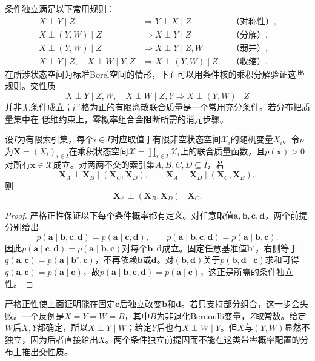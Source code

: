 条件独立满足以下常用规则：
\[
\begin{aligned}
  X\perp Y\mid Z
  &\Longrightarrow Y\perp X\mid Z
  &&\text{（对称性）},\\
  X\perp(Y,W)\mid Z
  &\Longrightarrow X\perp Y\mid Z
  &&\text{（分解）},\\
  X\perp(Y,W)\mid Z
  &\Longrightarrow X\perp Y\mid Z,W
  &&\text{（弱并）},\\
  X\perp Y\mid Z,\quad X\perp W\mid Y,Z
  &\Longrightarrow X\perp(Y,W)\mid Z
  &&\text{（收缩）}.
\end{aligned}
\]
在所涉状态空间为标准Borel空间的情形，下面可以用条件核的乘积分解验证这些规则。交性质
\[ X\perp Y\mid Z,W,\quad
  X\perp W\mid Z,Y\Longrightarrow X\perp(Y,W)\mid Z \]
并非无条件成立；严格为正的有限离散联合质量是一个常用充分条件。若分布把质量集中在
低维约束上，零概率组合会阻断所需的消元步骤。

\begin{lemma}[严格正离散分布的交性质]
  \label{lem:probability-positive-intersection}
  设$I$为有限索引集，每个$i\in I$对应取值于有限非空状态空间$\mathcal{X}_i$的随机变量$X_i$。令$p$为$\bm{X}=(X_i)_{i\in I}$在乘积状态空间$\mathcal{X}=\prod_{i\in I}\mathcal{X}_i$上的联合质量函数，且$p(\bm{x})>0$对所有$\bm{x}\in\mathcal{X}$成立。对两两不交的索引集$A,B,C,D\subseteq I$，若
  \[
    \bm{X}_A\perp\bm{X}_B\mid(\bm{X}_C,\bm{X}_D),
    \qquad
    \bm{X}_A\perp\bm{X}_D\mid(\bm{X}_C,\bm{X}_B),
  \]
  则
  \[
    \bm{X}_A\perp(\bm{X}_B,\bm{X}_D)\mid\bm{X}_C.
  \]
\end{lemma}

\begin{proof}
严格正性保证以下每个条件概率都有定义。对任意取值$\bm{a},\bm{b},\bm{c},\bm{d}$，两个前提分别给出
\[
  p(\bm{a}\mid\bm{b},\bm{c},\bm{d})
  =p(\bm{a}\mid\bm{c},\bm{d}),
  \qquad
  p(\bm{a}\mid\bm{b},\bm{c},\bm{d})
  =p(\bm{a}\mid\bm{b},\bm{c}).
\]
因此$p(\bm{a}\mid\bm{c},\bm{d})=p(\bm{a}\mid\bm{b},\bm{c})$对每个$\bm{b},\bm{d}$成立。固定任意基准值$\bm{b}^{\circ}$，右侧等于$q(\bm{a},\bm{c})=p(\bm{a}\mid\bm{b}^{\circ},\bm{c})$，不再依赖$\bm{b}$或$\bm{d}$。对$(\bm{b},\bm{d})$关于$p(\bm{b},\bm{d}\mid\bm{c})$求和可得$q(\bm{a},\bm{c})=p(\bm{a}\mid\bm{c})$，故$p(\bm{a}\mid\bm{b},\bm{c},\bm{d})=p(\bm{a}\mid\bm{c})$，这正是所需的条件独立性。
\end{proof}
严格正性使上面证明能在固定\(\bm c\)后独立改变\(\bm b\)和\(\bm d\)。若只支持部分组合，这一步会失败。一个反例是\(X=Y=W=B\)，其中\(B\)为非退化Bernoulli变量，\(Z\)取常数。给定\(W\)后\(X,Y\)都确定，所以\(X\perp Y\mid W\)；给定\(Y\)后也有\(X\perp W\mid Y\)。但\(X\)与\((Y,W)\)显然不独立，因为后者直接给出\(X\)。两个条件独立前提因而不能在这类带零概率配置的分布上推出交性质。

